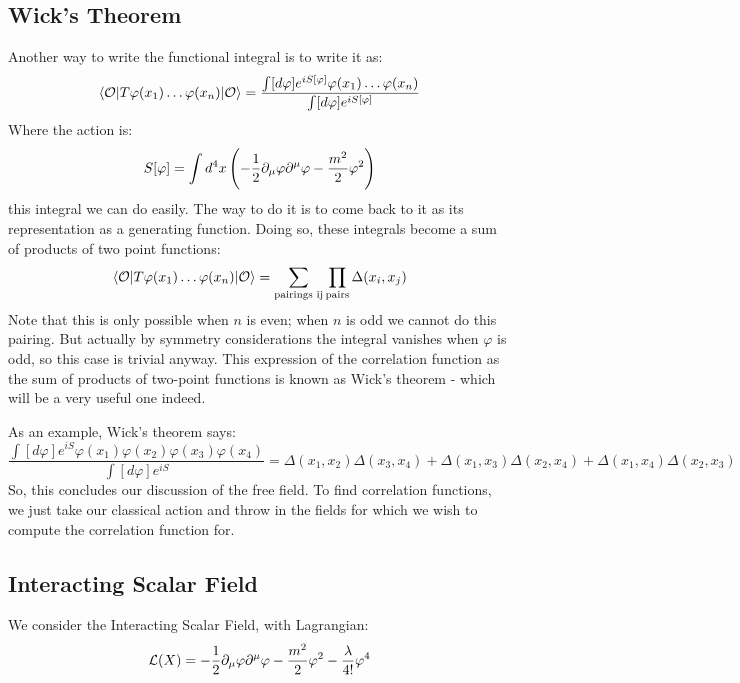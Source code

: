 \subsection{Wick's Theorem}
Another way to write the functional integral is to write it as:
\begin{equation}
    \bra{\O}T\varphi(x_1) \ldots \varphi(x_n)\ket{\O} = \frac{\int [d\varphi]e^{iS[\varphi]}\varphi(x_1) \ldots \varphi(x_n)}{\int [d\varphi]e^{iS[\varphi]}}
\end{equation}
Where the action is:
\begin{equation}
    S[\varphi] = \int d^4x \left(-\frac{1}{2}\p_\mu \varphi \p^\mu \varphi - \frac{m^2}{2}\varphi^2\right)
\end{equation}
this integral we can do easily. The way to do it is to come back to it as its representation as a generating function. Doing so, these integrals become a sum of products of two point functions:
\begin{equation}
    \bra{\O}T\varphi(x_1) \ldots \varphi(x_n)\ket{\O} = \sum_{\text{pairings ij}}\prod_{\text{pairs}} \Delta(x_i, x_j)
\end{equation}
Note that this is only possible when $n$ is even; when $n$ is odd we cannot do this pairing. But actually by symmetry considerations the integral vanishes when $\varphi$ is odd, so this case is trivial anyway. This expression of the correlation function as the sum of products of two-point functions is known as Wick's theorem - which will be a very useful one indeed.

As an example, Wick's theorem says:
\begin{equation}
    \frac{\int [d\varphi]e^{iS}\varphi(x_1)\varphi(x_2)\varphi(x_3)\varphi(x_4)}{\int [d\varphi]e^{iS}} = \Delta(x_1, x_2)\Delta(x_3, x_4) + \Delta(x_1, x_3)\Delta(x_2, x_4) + \Delta(x_1, x_4)\Delta(x_2, x_3)
\end{equation}
So, this concludes our discussion of the free field. To find correlation functions, we just take our classical action and throw in the fields for which we wish to compute the correlation function for.

\subsection{Interacting Scalar Field}
We consider the Interacting Scalar Field, with Lagrangian:
\begin{equation}
    \L(X) = -\frac{1}{2}\p_\mu \varphi \p^\mu \varphi - \frac{m^2}{2}\varphi^2 - \frac{\lambda}{4!}\varphi^4
\end{equation}

